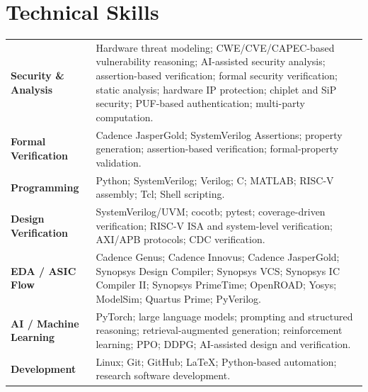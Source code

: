 \documentclass[11pt,letterpaper]{article}
\begin{document}
\section*{Technical Skills}
{\renewcommand{\arraystretch}{1.25}
\newcommand{\skill}[1]{\color{cvnavy}\bfseries #1}
\begin{tabularx}{\textwidth}{@{\hspace{0.4em}}>{\raggedright\arraybackslash}m{4.0cm}X@{}}
\skill{Security \& Analysis} & Hardware threat modeling; CWE/CVE/CAPEC-based vulnerability
  reasoning; AI-assisted security analysis; assertion-based verification; formal security
  verification; static analysis; hardware IP protection; chiplet and SiP security; PUF-based
  authentication; multi-party computation. \\
\skill{Formal Verification} & Cadence JasperGold; SystemVerilog Assertions; property generation;
  assertion-based verification; formal-property validation. \\
\skill{Programming} & Python; SystemVerilog; Verilog; C; MATLAB; RISC-V assembly; Tcl; Shell
  scripting. \\
\skill{Design Verification} & SystemVerilog/UVM; cocotb; pytest; coverage-driven verification;
  RISC-V ISA and system-level verification; AXI/APB protocols; CDC verification. \\
\skill{EDA / ASIC Flow} & Cadence Genus; Cadence Innovus; Cadence JasperGold; Synopsys Design
  Compiler; Synopsys VCS; Synopsys IC Compiler II; Synopsys PrimeTime; OpenROAD; Yosys; ModelSim;
  Quartus Prime; PyVerilog. \\
\skill{AI / Machine Learning} & PyTorch; large language models; prompting and structured
  reasoning; retrieval-augmented generation; reinforcement learning; PPO; DDPG; AI-assisted design
  and verification. \\
\skill{Development} & Linux; Git; GitHub; LaTeX; Python-based automation; research software
  development. \\
\end{tabularx}}
\end{document}
